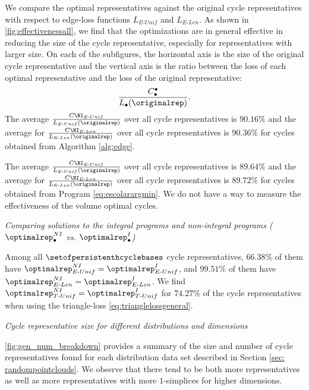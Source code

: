 We compare the optimal representatives against the original cycle representatives with respect to edge-loss functions $L_{E\text{-}Unif}$ and $L_{E\text{-}Len}$. As shown in \fig \ref{fig:effectivenessall}, we find that the optimizations are in general effective in reducing the size of the cycle representative, especially for representatives with larger size. On each of the subfigures, the horizontal axis is the size of the original cycle representative and the vertical axis is the ratio between the loss of each optimal representative and the loss of the original representative:
$$\frac{C^\bullet_\bullet}{L_\bullet(\originalrep)}.$$ 
The average $\frac{C\NI_{E\text{-}Unif}}{L_{E\text{-}Unif}(\originalrep)}$ over all cycle representatives is $90.16\%$ and the average for $\frac{C\NI_{E\text{-}Len}}{L_{E\text{-}Len}(\originalrep)}$ over all cycle representatives is $90.36\%$ for cycles obtained from Algorithm \ref{alg:edge}.

The average $\frac{C\NI_{E\text{-}Unif}}{L_{E\text{-}Unif}(\originalrep)}$ over all cycle representatives is $89.64\%$ and the average for $\frac{C\NI_{E\text{-}Len}}{L_{E\text{-}Len}(\originalrep)}$ over all cycle representatives is $89.72\%$ for cycles obtained from Program \eqref{eq:escolarargmin}. We do not have a way to measure the effectiveness of the volume optimal cycles. %

\noindent \emph{Comparing solutions to the integral programs and non-integral programs ( $\optimalrep^{NI}_\bullet$ vs. $\optimalrep^{I}_{\bullet}$)}

Among all $\setofpersistenthcyclebases$ cycle representatives, $66.38\%$ of them have $\optimalrep^{NI}_{E\text{-}Unif} = \optimalrep^{I}_{E\text{-}Unif}$, and  $99.51\%$ of them have $\optimalrep^{NI}_{E\text{-}Len} = \optimalrep^{I}_{E\text{-}Len}$. We find $\optimalrep^{NI}_{T\text{-}Unif} = \optimalrep^{I}_{T\text{-}Unif}$ for $74.27\%$ of the cycle representatives when using the triangle-loss \pr \eqref{eq:trianglelossgeneral}. %


\noindent \emph{Cycle representative size for different distributions and dimensions}

\fig \ref{fig:gen_num_breakdown} provides a summary of the size and number of cycle representatives found for each distribution data set described in Section \ref{sec: randompointclouds}. We observe that there tend to be both more representatives as well as more representatives with more $1$-simplices for higher dimensions.

